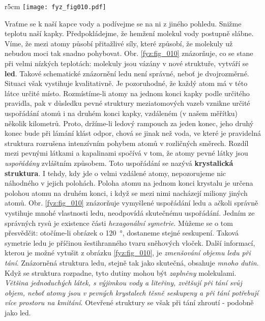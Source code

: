 {      \begin{wrapfigure}[12]{r}{5cm}   %
        \centering
        \texttt{[image: fyz\_fig010.pdf]}
        \caption{Led \cite[s.~19]{Feynman01}}
        \label{fyz:fig_010}
      \end{wrapfigure}
      Vraťme se k naší kapce vody a podívejme se na ni z jiného pohledu. Snižme teplotu naší kapky. 
      Předpokládejme, že hemžení molekul vody postupně slábne. Víme, že mezi atomy působí 
      přitažlivé síly, které způsobí, že molekuly už nebudou moci tak snadno pohybovat. Obr. 
      \ref{fyz:fig_010} znázorňuje, co se stane při velmi nízkých teplotách: molekuly jsou vázány v 
      nové struktuře, vytváří se \textbf{led}. Takové schematické znázornění ledu není správné, 
      neboť je dvojrozměrné. Situaci však vystihuje kvalitativně. Je pozoruhodné, že každý atom má 
      v této látce určité místo. Rozmístíme-li atomy na jednom konci kapky podle určitého pravidla, 
      pak v důsledku pevné struktury meziatomových vazeb vznikne určité uspořádání atomů i na 
      druhém konci kapky, vzdáleném (v našem měřítku) několik kilometrů. Proto, držíme-li ledový 
      rampouch za jeden konec, jeho druhý konec bude při lámání klást odpor, chová se jinak než 
      voda, ve které je pravidelná struktura rozrušena intenzívním pohybem atomů v rozličných 
      směrech. Rozdíl mezi pevnými látkami a kapalinami spočívá v tom, že atomy pevné látky jsou 
      \emph{uspořádány} zvláštním způsobem. Toto uspořádání se nazývá \textbf{krystalická 
      struktura}. I tehdy, kdy jde o velmi vzdálené atomy, nepozorujeme nic náhodného v jejich 
      polohách. Poloha atomu na jednom konci krystalu je určena polohou atomu na druhém konci, i 
      když se mezi nimi nacházejí miliony jiných atomů. Obr. \ref{fyz:fig_010} znázorňuje vymyšlené 
      uspořádání ledu a ačkoli správně vystihuje mnohé vlastnosti ledu, neodpovídá skutečnému 
      uspořádání. Jedním ze správných rysů je existence části \emph{hexagonální symetrie}. Můžeme 
      se o tom přesvědčit: otočíme-li obrázek o \SI{120}{\degree}, dostaneme stejné seskupení. 
      Taková symetrie ledu je příčinou šestihranného tvaru sněhových vloček. Další informací, 
      kterou je možné vytušit z obrázku \ref{fyz:fig_010}, je \emph{zmenšování objemu ledu při 
      tání}. Znázorněná struktura ledu, stejně tak jako skutečná, obsahuje \emph{mnoho dutin}. Když 
      se struktura rozpadne, tyto dutiny mohou být \emph{zaplněny} molekulami. \emph{Většina 
      jednoduchých látek, s výjimkou vody a liteřiny, zvětšují při tání svůj objem, neboť atomy 
      jsou v pevných krystalech těsně seskupeny a při tání potřebují více prostoru na kmitání}. 
      Otevřené struktury se však při tání zhroutí - podobně jako led.
      
}
